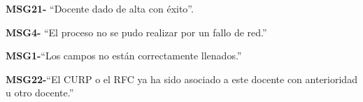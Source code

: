 \begin{Citemize}
    \item {\bf MSG21-} ``Docente dado de alta con éxito''.
    \item {\bf MSG4-}  ``El proceso no se pudo realizar por un fallo de red.''
    \item {\bf MSG1-}{``Los campos no están correctamente llenados.''}
    \item {\bf MSG22-}{``El CURP o el RFC ya ha sido asociado a este docente con anterioridad u otro docente.''}
\end{Citemize}

